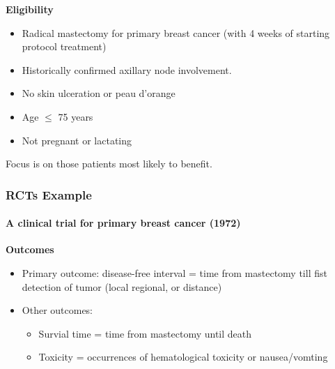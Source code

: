 \documentclass[table,10pt]{beamer}
\begin{document}
\begin{CJK*}{UTF8}{gbsn}
\begin{frame}[t]
\textbf{Eligibility}
\begin{itemize}
	\item Radical mastectomy for primary breast cancer (with 4 weeks of starting protocol treatment)
	\item Historically confirmed axillary node involvement.
	\item No skin ulceration or peau d'orange
	\item Age $\le$ 75 years
	\item Not pregnant or lactating
\end{itemize}
Focus is on those patients most likely to benefit.
\end{frame}


\begin{frame}[t]
\frametitle{RCTs Example}
\framesubtitle{A clinical trial for primary breast cancer (1972)}
\textbf{Outcomes}
\begin{itemize}
	\item Primary outcome: disease-free interval = time from mastectomy till fist detection of tumor (local 
		regional, or distance)
	\item Other outcomes:
	\begin{itemize}
		\item Survial time = time from mastectomy until death
		\item Toxicity = occurrences of hematological toxicity or nausea/vomting
	\end{itemize}
\end{itemize}
\end{frame}


\end{CJK*}
\end{document}
